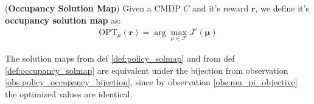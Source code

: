 \begin{definition}
    \label{def:occupancy_solmap}
    (\textbf{Occupancy Solution Map})
    Given a CMDP $\textit{C}$ and it's reward $\bm{r}$, we define it's \textbf{occupancy solution map} as:
    \begin{align*}
        \text{OPT}_{\mu}(\bm{r}) = \arg \max_{\mu\in \mathcal{F}}  J^\nu(\bm{\mu})
    \end{align*}
\end{definition}

\begin{observation}
    The solution maps from def \ref{def:policy_solmap} and from def \ref{def:occupancy_solmap}  are equivalent under the bijection from observation \ref{obs:policy_occupancy_bijection}, since by observation \ref{obs:mu_pi_objective} the optimized values are identical.
\end{observation}